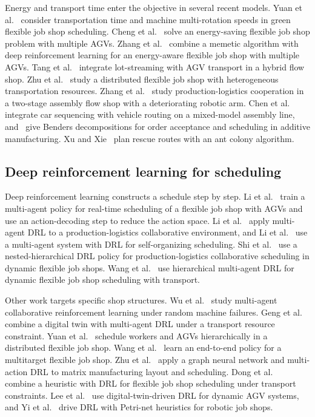 Energy and transport time enter the objective in several recent models. Yuan
et al.~\cite{yuan2025green} consider transportation time and machine
multi-rotation speeds in green flexible job shop scheduling. Cheng et
al.~\cite{cheng2025energy} solve an energy-saving flexible job shop problem
with multiple AGVs. Zhang et al.~\cite{zhang2024memetic} combine a memetic
algorithm with deep reinforcement learning for an energy-aware flexible job
shop with multiple AGVs. Tang et al.~\cite{tang2025lotstreaming} integrate
lot-streaming with AGV transport in a hybrid flow shop. Zhu et
al.~\cite{zhu2026dfjspht} study a distributed flexible job shop with
heterogeneous transportation resources. Zhang et al.~\cite{zhang2026amr}
study production-logistics cooperation in a two-stage assembly flow shop
with a deteriorating robotic arm. Chen et
al.~\cite{chen2025carseq} integrate car sequencing with vehicle routing on a
mixed-model assembly line, and~\cite{chen2026benders} give Benders
decompositions for order acceptance and scheduling in additive
manufacturing. Xu and Xie~\cite{xu2025forest} plan rescue routes with an ant
colony algorithm.

\subsection{Deep reinforcement learning for scheduling}

Deep reinforcement learning constructs a schedule step by step. Li et
al.~\cite{li2025tsmc} train a multi-agent policy for real-time scheduling of
a flexible job shop with AGVs and use an action-decoding step to reduce the
action space. Li et al.~\cite{li2025plcsp} apply multi-agent DRL to a
production-logistics collaborative environment, and Li et
al.~\cite{li2025jms} use a multi-agent system with DRL for self-organizing
scheduling. Shi et al.~\cite{shi2025nested} use a nested-hierarchical DRL
policy for production-logistics collaborative scheduling in dynamic flexible
job shops. Wang et al.~\cite{wang2025hierarchical} use hierarchical
multi-agent DRL for dynamic flexible job shop scheduling with transport.

Other work targets specific shop structures. Wu et al.~\cite{wu2026madappo}
study multi-agent collaborative reinforcement learning under random machine
failures. Geng et al.~\cite{geng2025dtdrl} combine a digital twin with
multi-agent DRL under a transport resource constraint. Yuan et
al.~\cite{yuan2026workers} schedule workers and AGVs hierarchically in a
distributed flexible job shop. Wang et al.~\cite{wang2025multitarget} learn
an end-to-end policy for a multitarget flexible job shop. Zhu et
al.~\cite{zhu2025matrix} apply a graph neural network and multi-action DRL
to matrix manufacturing layout and scheduling. Dong et
al.~\cite{dong2025heuristic} combine a heuristic with DRL for flexible job
shop scheduling under transport constraints. Lee et al.~\cite{lee2026digitaltwin}
use digital-twin-driven DRL for dynamic AGV systems, and Yi et
al.~\cite{yi2026petri} drive DRL with Petri-net heuristics for robotic job
shops.

